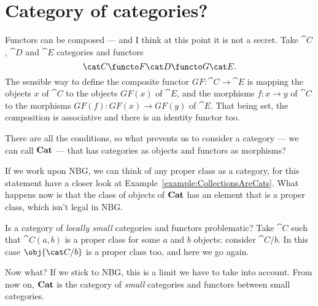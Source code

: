 
\section{Category of categories?}


Functors can be composed --- and I think at this point it is not a secret. Take \(\cat C\), \(\cat D\) and \(\cat E\) categories and functors
\[\cat C \functo F \cat D \functo G \cat E .\]
The sensible way to define the composite functor \(GF : \cat C \to \cat E\) is mapping the objects \(x\) of \(\cat C\) to the objects \(GF(x)\) of \(\cat E\), and the morphisms \(f : x \to y\) of \(\cat C\) to the morphisms \(GF(f) : GF(x) \to GF(y)\) of \(\cat E\). That being set, the composition is associative and there is an identity functor too.

There are all the conditions, so what prevents us to consider a category --- we can call \(\bf Cat\) --- that has categories as objects and functors as morphisms?

If we work upon NBG, we can think of any proper class as a category, for this statement have a closer look at Example~\ref{example:CollectionsAreCats}. What happens now is that the class of objects of \(\bf Cat\) has an element that is a proper class, which isn't legal in NBG.

Is a category of {\em locally small} categories and functors problematic? Take \(\cat C\) such that \(\cat C(a, b)\) is a proper class for some \(a\) and \(b\) objects: consider \(\cat C{/}{b}\). In this case \(\obj{\cat C/b}\) is a proper class too, and here we go again.

Now what? If we stick to NBG, this is a limit we have to take into account. From now on, \(\bf Cat\) is the category of {\em small} categories and functors between small categories.
